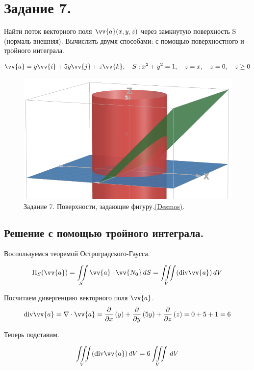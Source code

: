 \newpage

\section{Задание 7.}

Найти поток векторного поля $\vv{a}(x, y, z)$ через замкнутую поверхность S (нормаль внешняя). Вычислить двумя способами: с помощью поверхностного и тройного интеграла.

$$\vv{a} = y\vv{i} + 5y\vv{j} + z\vv{k}, \quad S: x^2 + y^2 = 1, \quad z = x, \quad z = 0, \quad z \geq 0$$

\begin{figure}[h!t]
    \centering
    \includegraphics[width=0.5\linewidth]{Task7/Surfaces_closing_the_figure.png}
    \caption{Задание 7. Поверхности, задающие фигуру.\underline{\href{https://www.desmos.com/3d/pfnmmjbtkb}{(Desmos)}}.}
\end{figure}

\subsection{Решение с помощью тройного интеграла.}

Воспользуемся теоремой Остроградского-Гаусса.

$$\Pi_S(\vv{a}) = \iint \limits_S \vv{a} \cdot \vv{N_0} \, dS = \iiint \limits_V (\text{div}\vv{a})\,dV$$

Посчитаем дивергенцию векторного поля $\vv{a}$.
$$\text{div}\vv{a} = \nabla \cdot \vv{a} = \dfrac{\partial}{\partial x}\left(y\right) + \dfrac{\partial}{\partial y}\left(5y\right) + \dfrac{\partial}{\partial z}\left(z\right) = 0 + 5 + 1 = 6$$

Теперь подставим.

$$\iiint \limits_V (\text{div}\vv{a})\,dV = 6 \iiint \limits_V \,dV$$

